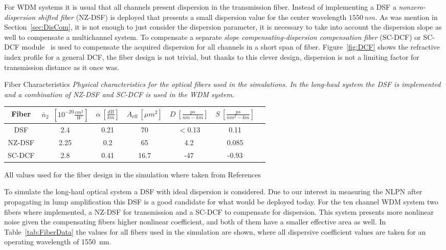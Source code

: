 For WDM systems it is usual that all channels present dispersion in the transmission fiber. Instead of implementing a DSF a \textit{nonzero-dispersion shifted fiber} (NZ-DSF) is deployed that presents a small dispersion value for the center wavelength $1550~nm$. As was mention in Section~\ref{sec:DisCom}, it is not enough to just consider the dispersion parameter, it is necessary to take into account the dispersion slope as well to compensate a multichannel system. To compensate a separate \textit{slope compensating-dispersion compensation fiber} (SC-DCF) or SC-DCF module~\cite{aikawa2005dispersion} is used to compensate the acquired dispersion for all channels in a short span of fiber. Figure~\ref{fig:DCF} shows the refractive index profile for a general DCF, the fiber design is not trivial, but thanks to this clever design, dispersion is not a limiting factor for transmission distance as it once was.


\begin{mytable}[float=h, label=tab:FiberData]{ Fiber Characteristics}
\emph{Physical characteristics for the optical fibers used in the simulations. In the long-haul system the DSF is implemented and a combination of NZ-DSF and SC-DCF is used in the WDM system. }
\begin{center}
\begin{tabular}{c|cccccc} 
\toprule
Fiber& $\bar{n}_{2}$~$[10^{-20}\frac{cm^2}{W}]$ & $\alpha~[\frac{dB}{km}]$ & $A_{\text{eff}}~[\mu m^2] $  & $D~[\frac{ps}{nm-km}]$ & $S~[\frac{ps}{nm^2-km}]$   \\ 
\midrule
DSF & 2.4 & 0.21 & 70 & $<$0.13 & 0.11  \\ 
\midrule
NZ-DSF & 2.25 & 0.2 & 65 & 4.2 & 0.085  \\ 
\midrule
SC-DCF & 2.8 & 0.41 & 16.7 & -47 & -0.93  \\ 
\bottomrule
\end{tabular} 
\end{center}
All values used for the fiber design in the simulation where taken from References~\cite{kato2000dispersion,kim1994measurement,aikawa2005dispersion,namihira2002comparison} 
\end{mytable}

To simulate the long-haul optical system a DSF with ideal dispersion is considered. Due to our interest in measuring the NLPN after propagating in lump amplification this DSF is a good candidate for what would be deployed today. For the ten channel WDM system two fibers where implemented, a NZ-DSF for transmission and a SC-DCF to compensate for dispersion. This system presents more nonlinear noise given the compensating fibers higher nonlinear coefficient, and both of them have a smaller effective area as well. In  Table~\ref{tab:FiberData} the values for all fibers used in the simulation are shown, where all dispersive coefficient values are taken for an operating wavelength of 1550~nm.
 


